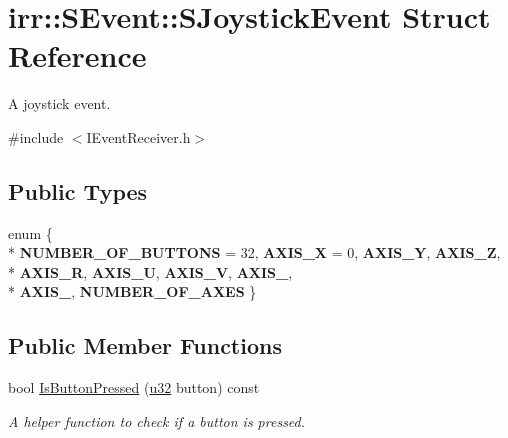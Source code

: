 \hypertarget{structirr_1_1SEvent_1_1SJoystickEvent}{}\section{irr\+:\+:S\+Event\+:\+:S\+Joystick\+Event Struct Reference}
\label{structirr_1_1SEvent_1_1SJoystickEvent}


A joystick event.  




{\ttfamily \#include $<$I\+Event\+Receiver.\+h$>$}

\subsection*{Public Types}
\begin{DoxyCompactItemize}
\item 
enum \{ \\*
{\bfseries N\+U\+M\+B\+E\+R\+\_\+\+O\+F\+\_\+\+B\+U\+T\+T\+O\+NS} = 32, 
{\bfseries A\+X\+I\+S\+\_\+X} = 0, 
{\bfseries A\+X\+I\+S\+\_\+Y}, 
{\bfseries A\+X\+I\+S\+\_\+Z}, 
\\*
{\bfseries A\+X\+I\+S\+\_\+R}, 
{\bfseries A\+X\+I\+S\+\_\+U}, 
{\bfseries A\+X\+I\+S\+\_\+V}, 
{\bfseries A\+X\+I\+S\+\_}, 
\\*
{\bfseries A\+X\+I\+S\+\_}, 
{\bfseries N\+U\+M\+B\+E\+R\+\_\+\+O\+F\+\_\+\+A\+X\+ES}
 \}\hypertarget{structirr_1_1SEvent_1_1SJoystickEvent_a2b0fac734e2cb4a5700ebadb68e5ef71}{}\label{structirr_1_1SEvent_1_1SJoystickEvent_a2b0fac734e2cb4a5700ebadb68e5ef71}

\end{DoxyCompactItemize}
\subsection*{Public Member Functions}
\begin{DoxyCompactItemize}
\item 
bool \hyperlink{structirr_1_1SEvent_1_1SJoystickEvent_adac7656dc2bc1fedab52d7f84ce52872}{Is\+Button\+Pressed} (\hyperlink{namespaceirr_a0416a53257075833e7002efd0a18e804}{u32} button) const \hypertarget{structirr_1_1SEvent_1_1SJoystickEvent_adac7656dc2bc1fedab52d7f84ce52872}{}\label{structirr_1_1SEvent_1_1SJoystickEvent_adac7656dc2bc1fedab52d7f84ce52872}

\begin{DoxyCompactList}\small\item\em A helper function to check if a button is pressed. \end{DoxyCompactList}\end{DoxyCompactItemize}
